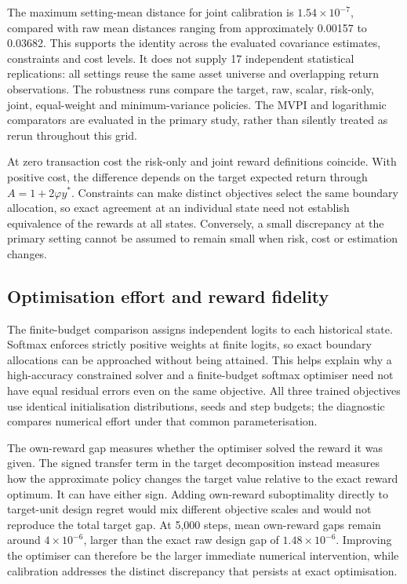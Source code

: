 \documentclass[sigconf,review]{acmart}
\begin{document}
The maximum setting-mean distance for joint calibration is $1.54\times10^{-7}$, compared with raw mean distances ranging from approximately 0.00157 to 0.03682. This supports the identity across the evaluated covariance estimates, constraints and cost levels. It does not supply 17 independent statistical replications: all settings reuse the same asset universe and overlapping return observations. The robustness runs compare the target, raw, scalar, risk-only, joint, equal-weight and minimum-variance policies. The MVPI and logarithmic comparators are evaluated in the primary study, rather than silently treated as rerun throughout this grid.

At zero transaction cost the risk-only and joint reward definitions coincide. With positive cost, the difference depends on the target expected return through $A=1+2\varphi y^*$. Constraints can make distinct objectives select the same boundary allocation, so exact agreement at an individual state need not establish equivalence of the rewards at all states. Conversely, a small discrepancy at the primary setting cannot be assumed to remain small when risk, cost or estimation changes.

\subsection{Optimisation effort and reward fidelity}
The finite-budget comparison assigns independent logits to each historical state. Softmax enforces strictly positive weights at finite logits, so exact boundary allocations can be approached without being attained. This helps explain why a high-accuracy constrained solver and a finite-budget softmax optimiser need not have equal residual errors even on the same objective. All three trained objectives use identical initialisation distributions, seeds and step budgets; the diagnostic compares numerical effort under that common parameterisation.

The own-reward gap measures whether the optimiser solved the reward it was given. The signed transfer term in the target decomposition instead measures how the approximate policy changes the target value relative to the exact reward optimum. It can have either sign. Adding own-reward suboptimality directly to target-unit design regret would mix different objective scales and would not reproduce the total target gap. At 5,000 steps, mean own-reward gaps remain around $4\times10^{-6}$, larger than the exact raw design gap of $1.48\times10^{-6}$. Improving the optimiser can therefore be the larger immediate numerical intervention, while calibration addresses the distinct discrepancy that persists at exact optimisation.
\end{document}
